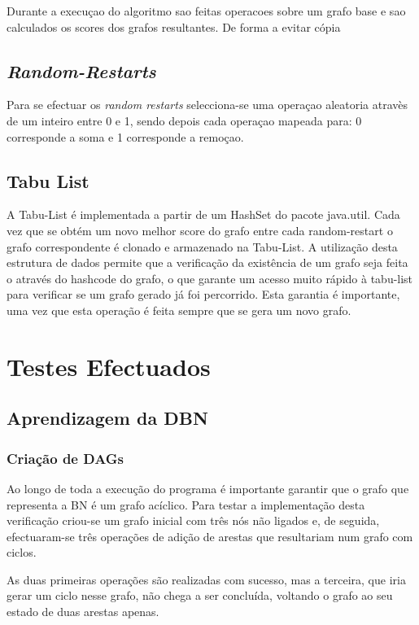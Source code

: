 \documentclass[10pt]{article}
\numberwithin{equation}{section}
\begin{document}
Durante a execuçao do algoritmo sao feitas operacoes sobre um grafo base e sao calculados os scores dos grafos resultantes. De forma a evitar cópia 

\subsection{\textit{Random-Restarts}}

Para se efectuar os \textit{random restarts} selecciona-se uma operaçao aleatoria atravès de um inteiro entre 0 e 1, sendo depois cada operaçao mapeada para: 0 corresponde a soma e 1 corresponde a remoçao.

\subsection{Tabu List}

A Tabu-List é implementada a partir de um HashSet do pacote java.util. Cada vez que se obtém um novo melhor score do grafo entre cada random-restart o grafo correspondente é clonado e armazenado na Tabu-List. A utilização desta estrutura de dados permite que a verificação da existência de um grafo seja feita o através do hashcode do grafo, o que garante um acesso muito rápido à tabu-list para verificar se um grafo gerado já foi percorrido. Esta garantia é importante, uma vez que esta operação é feita sempre que se gera um novo grafo.

\section{Testes Efectuados}
\subsection{Aprendizagem da DBN}

\subsubsection{Criação de DAGs}

Ao longo de toda a execução do programa é importante garantir que o grafo que representa a BN é um grafo acíclico. Para testar a implementação desta verificação criou-se um grafo inicial com três nós não ligados e, de seguida, efectuaram-se três operações de adição de arestas que resultariam num grafo com ciclos. 

As duas primeiras operações são realizadas com sucesso, mas a terceira, que iria gerar um ciclo nesse grafo, não chega a ser concluída, voltando o grafo ao seu estado de duas arestas apenas. 
\end{document}
